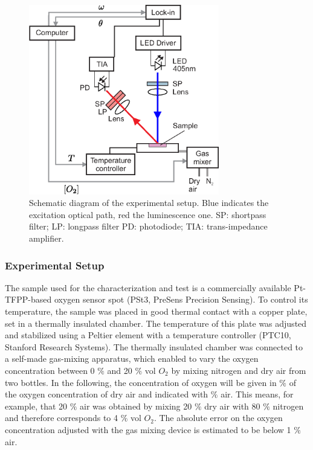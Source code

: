 \documentclass[final,5p,times,twocolumn]{elsarticle}
\begin{document}
\begin{figure}[t!]
\centering
\includegraphics[keepaspectratio, width=8.3cm]{Setup_auto.eps}
\caption{Schematic diagram of the experimental setup. Blue indicates the excitation optical path, red the luminescence one. SP: shortpass filter; LP: longpass filter PD: photodiode; TIA: trans-impedance amplifier.}
\label{fig:setup}
\end{figure}


\subsubsection{Experimental Setup}

The sample used for the characterization and test is a commercially available Pt-TFPP-based oxygen sensor spot (PSt3, PreSens Precision Sensing).
To control its temperature, the sample was placed in good thermal contact with a copper plate, set in a thermally insulated chamber. The temperature of this plate was adjusted and stabilized using a Peltier element with a temperature controller (PTC10, Stanford Research Systems). The thermally insulated chamber was connected to a self-made gas-mixing apparatus, which enabled to vary the oxygen concentration between 0 $\%$ and 20 $\%$ vol $O_2$ by mixing nitrogen and dry air from two bottles. In the following, the concentration of oxygen will be given in $\%$ of the oxygen concentration of dry air and indicated with $\%$ air. This means, for example, that 20 $\%$ air was obtained by mixing 20 $\%$ dry air with 80 $\%$ nitrogen and therefore corresponds to 4 $\%$ vol $O_2$. The absolute error on the oxygen concentration adjusted with the gas mixing device is estimated to be below 1 $\%$ air. 
 
\end{document}
